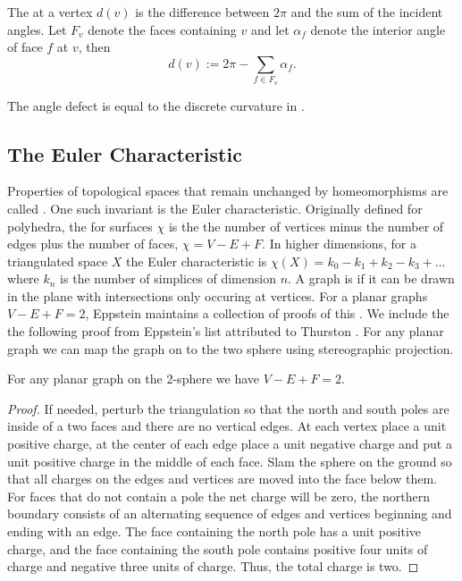 The  at a vertex $d(v)$ is the difference between $2\pi$ and
the sum of the incident angles.  Let $F_v$ denote the faces containing $v$  
and let $\alpha_f$  denote the interior  angle of face $f$ at $v$, then
$$d(v):=2\pi -\sum_{f\in F_v}\alpha_f.$$

The angle defect is equal to the discrete curvature in .

\subsection{The Euler Characteristic}

Properties of topological spaces that remain unchanged by homeomorphisms are called
. One such invariant is the Euler characteristic.
Originally defined for polyhedra, the  for surfaces $\chi$ is the 
the number of vertices minus the number of edges plus  the number of faces, $\chi=V-E+F.$
In higher dimensions, for a triangulated space $X$ the Euler characteristic is 
$\chi(X)=k_0-k_1+k_2-k_3+\ldots$ where $k_n$ is the number of simplices of dimension $n.$
A  graph  is  if it can be drawn in the plane with intersections only occuring
at vertices.
For a planar graphs $V-E+F=2$, Eppstein maintains a collection of proofs of this \cite{eppstein-proofs}.
We include the the following proof from Eppstein's list attributed to Thurston
 \cite{thurston}. For any planar graph we can map the graph on to the two sphere
 using stereographic projection.
 
\begin{theorem}\label{thm:euler}
For any planar graph on the 2-sphere we have $V-E+F=2.$
\end{theorem}

\begin{proof}
If needed, perturb the triangulation so that the north and south poles are 
inside of a two faces and there are no vertical edges. At each vertex place a unit positive
charge, at the center of each edge place a unit negative charge and put a unit positive
charge in the middle of each face. Slam the sphere on the ground so that all charges
on the edges and vertices are moved into the face below them. For faces that do not contain a pole
the net charge will be zero, the northern boundary consists of an alternating sequence
of edges and vertices  beginning  and ending with an edge.
The face containing the north pole has a unit positive charge, and the face containing the south
pole contains positive four units of charge and negative three units of charge.
Thus, the total charge is two.

\end{proof}

